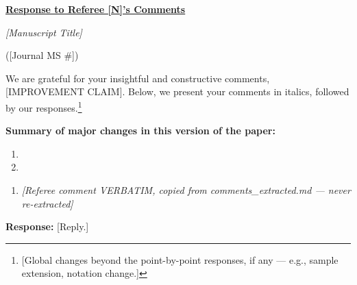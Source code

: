 \documentclass[12pt]{article}
\begin{document}

\begin{center}
    \underline{\textbf{Response to Referee [N]'s Comments}}
    \par\medskip
    \textit{[Manuscript Title]}
    \par ([Journal MS \#])
\end{center}

We are grateful for your insightful and constructive comments, [IMPROVEMENT CLAIM]. Below, we present your comments in italics, followed by our responses.\footnote{[Global changes beyond the point-by-point responses, if any — e.g., sample extension, notation change.]}

\textbf{Summary of major changes in this version of the paper:}
\begin{enumerate}
    \item [Change 1 — ask, action, pointer]
    \item [Change 2 — ask, action, pointer]
\end{enumerate}

\begin{enumerate}
    \setcounter{enumi}{0}   %
    \item \textit{[Referee comment VERBATIM, copied from comments_extracted.md — never re-extracted]}
\end{enumerate}

\textbf{Response:} [Reply.]
\end{document}

